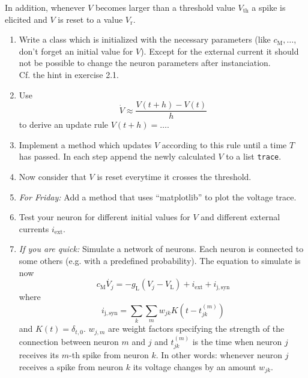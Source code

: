 \documentclass[12pt]{article}
\newcommand{\ind}[1]{_{\mathrm{#1}}}
\begin{document}
In addition, whenever $V$ becomes larger than a threshold value $V\ind{th}$ a spike is elicited and $V$ is reset to a value $V\ind{r}$.
\begin{enumerate}
\item Write a class which is initialized with the necessary parameters (like $c\ind{M},\dots$, don't forget an initial value for $V$). Except for the external current it should not be possible to change the neuron parameters after instanciation.\\
Cf. the hint in exercise 2.1.
\item Use 
\[ \dot{V}\approx\frac{V(t+h)-V(t)}{h}\]
 to derive an update rule $V(t+h)=\dots$.
\item Implement a method which updates $V$ according to this rule until a time $T$ has passed. In each step append the newly calculated $V$ to a list \texttt{trace}.
\item Now consider that $V$ is reset everytime it crosses the threshold.
\item \emph{For Friday:} Add a method that uses ``matplotlib'' to plot the voltage trace.
\item Test your neuron for different initial values for $V$ and different
  external currents $i\ind{ext}$.
\item \emph{If you are quick:} Simulate a network of neurons. Each neuron is
  connected to some others (e.g. with a predefined probability). The equation
  to simulate is now 
\[c\ind{M}\dot{V_j}=-g\ind{L}\left(V_j-V\ind{L}\right)+i\ind{ext} + i\ind{j,syn}\]
where 
\[i\ind{j,syn} = \sum\limits_k \sum\limits_{m} w_{jk} K(t-t_{jk}^{(m)})\]
and $K(t)=\delta_{t,0}$. $w_{j,m}$ are weight factors specifying the strength
of the connection between neuron $m$ and $j$ and $t_{jk}^{(m)}$ is the time
when neuron $j$ receives its $m$-th spike from neuron $k$. In other words:
whenever neuron $j$ receives a spike from neuron $k$ its voltage changes by an
amount $w_{jk}$.
  
\end{enumerate}
\end{document}
